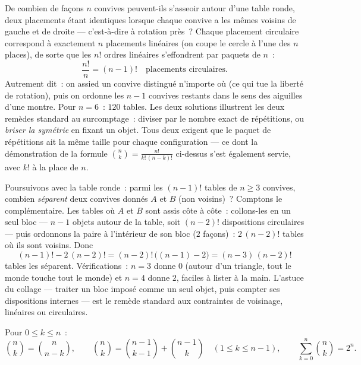 \begin{example}\label{ex:b1:counting:roundtable}
De combien de façons $n$ convives peuvent-ils s'asseoir autour d'une
table ronde, deux placements étant identiques lorsque chaque convive a
les mêmes voisins de gauche et de droite --- c'est-à-dire à rotation
près~? Chaque placement circulaire correspond à exactement $n$
placements linéaires (on coupe le cercle à l'une des $n$ places), de
sorte que les $n!$ ordres linéaires s'effondrent par paquets de $n$~:
\[
\frac{n!}{n} = (n-1)! \quad\text{placements circulaires.}
\]
Autrement dit~: on assied un convive distingué n'importe où (ce qui tue
la liberté de rotation), puis on ordonne les $n - 1$ convives restants
dans le sens des aiguilles d'une montre. Pour $n = 6$~: $120$ tables.
Les deux solutions illustrent les deux remèdes standard au surcomptage~:
diviser par le nombre exact de répétitions, ou \emph{briser la symétrie}
en fixant un objet. Tous deux exigent que le paquet de répétitions ait
la même taille pour chaque configuration --- ce dont la démonstration de
la formule $\binom nk = \frac{n!}{k!\,(n-k)!}$ ci-dessus s'est également
servie, avec $k!$ à la place de $n$.
\end{example}

\begin{example}\label{ex:b1:counting:constraint}
Poursuivons avec la table ronde~: parmi les $(n-1)!$ tables de $n \geq
3$ convives, combien \emph{séparent} deux convives donnés $A$ et $B$
(non voisins)~? Comptons le complémentaire. Les tables où $A$ et $B$
sont assis côte à côte~: collons-les en un seul bloc --- $n - 1$ objets
autour de la table, soit $(n-2)!$ dispositions circulaires --- puis
ordonnons la paire à l'intérieur de son bloc ($2$ façons)~: $2\,(n-2)!$
tables où ils sont voisins. Donc
\[
(n-1)! - 2\,(n-2)! = (n-2)!\,\bigl((n - 1) - 2\bigr)
= (n-3)\,(n-2)!
\]
tables les séparent. Vérifications~: $n = 3$ donne $0$ (autour d'un
triangle, tout le monde touche tout le monde) et $n = 4$ donne $2$,
faciles à lister à la main. L'astuce du collage --- traiter un bloc
imposé comme un seul objet, puis compter ses dispositions internes ---
est le remède standard aux contraintes de voisinage, linéaires ou
circulaires.
\end{example}

\begin{proposition}\label{prop:b1:counting:identities}
Pour $0 \leq k \leq n$~:
\[
\binom{n}{k} = \binom{n}{n-k},
\qquad
\binom{n}{k} = \binom{n-1}{k-1} + \binom{n-1}{k}
\quad (1 \leq k \leq n-1),
\qquad
\sum_{k=0}^{n} \binom{n}{k} = 2^n .
\]
\end{proposition}


